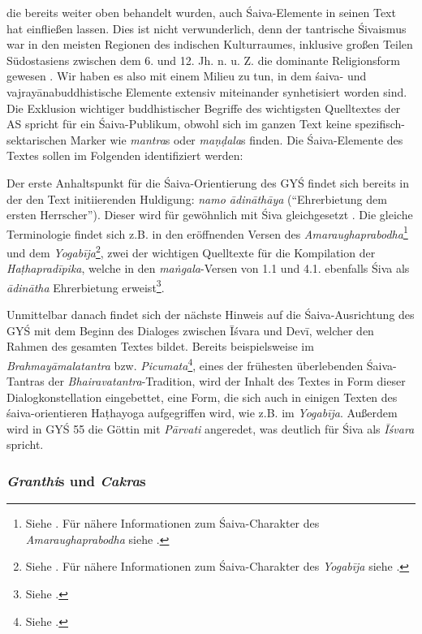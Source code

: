 \documentclass[a4paper,12pt]{article}
\begin{document}
{die bereits weiter oben behandelt wurden, auch Śaiva-Elemente in seinen Text hat einfließen lassen. Dies ist nicht verwunderlich, denn der tantrische Śivaismus war in den meisten Regionen des indischen Kulturraumes, inklusive großen Teilen Südostasiens zwischen dem 6. und 12. Jh. n. u. Z. die dominante Religionsform gewesen \parencite[41-44,252-54]{sanderson2016}. Wir haben es also mit einem Milieu zu tun, in dem śaiva- und vajrayānabuddhistische Elemente extensiv miteinander synhetisiert worden sind. Die Exklusion wichtiger buddhistischer Begriffe des wichtigsten Quelltextes der AS spricht für ein Śaiva-Publikum, obwohl sich im ganzen Text keine spezifisch-sektarischen Marker wie \textit{mantra}s oder \textit{maṇḍala}s finden. Die Śaiva-Elemente des Textes sollen im Folgenden identifiziert werden:

      Der erste Anhaltspunkt für die Śaiva-Orientierung des GYŚ findet sich bereits in der den Text initiierenden Huldigung: \textit{namo ādināthāya} (``Ehrerbietung dem ersten Herrscher''). Dieser wird für gewöhnlich mit Śiva gleichgesetzt \parencite[4]{mallinsonnath}. Die gleiche Terminologie findet sich z.B. in den eröffnenden Versen des \textit{Amaraughaprabodha}\footnote{Siehe \parencite[48]{ssp1954}. Für nähere Informationen zum Śaiva-Charakter des \textit{Amaraughaprabodha} siehe \parencite[235]{mallinson2014b}.} und dem \textit{Yogabīja}\footnote{Siehe \parencite{yogabija}. Für nähere Informationen zum Śaiva-Charakter des \textit{Yogabīja} siehe \parencite[234]{mallinson2014b}.}, zwei der wichtigen Quelltexte für die Kompilation der \textit{Haṭhapradīpika}, welche in den \textit{maṅgala}-Versen von 1.1 und 4.1. ebenfalls Śiva als \textit{ādinātha} Ehrerbietung erweist\footnote{Siehe \parencite{hp}.}.

      Unmittelbar danach findet sich der nächste Hinweis auf die Śaiva-Ausrichtung des GYŚ mit dem Beginn des Dialoges zwischen Īśvara und Devī, welcher den Rahmen des gesamten Textes bildet. Bereits beispielsweise im \textit{Brahmayāmalatantra} bzw. \textit{Picumata}\footnote{Siehe \parencite{brahmayamala}.}, eines der frühesten überlebenden Śaiva-Tantras der \textit{Bhairavatantra}-Tradition, wird der Inhalt des Textes in Form dieser Dialogkonstellation eingebettet, eine Form, die sich auch in einigen Texten des śaiva-orientieren Haṭhayoga aufgegriffen wird, wie z.B. im \textit{Yogabīja}. Außerdem wird in GYŚ 55 die Göttin mit \textit{Pārvati} angeredet, was deutlich für Śiva als \textit{Īśvara} spricht.   

\subsubsection{\textit{Granthi}s und \textit{Cakra}s}
      
}
\end{document}
